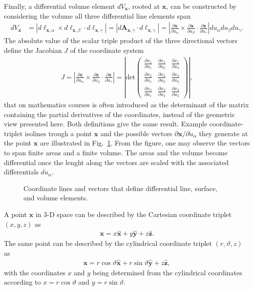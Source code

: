 Finally, a differential volume element $dV_{\bm{x}}$, rooted at $\bm{x}$, can be constructed by considering the volume all three differential line elements span
\begin{align}
    dV_{\bm{x}}&=\left|d\bm{\ell}_{\bm{x},\alpha}\times d\bm{\ell}_{\bm{x},\beta}\cdot d\bm{\ell}_{\bm{x},\gamma}\right|=|d\bm{A}_{\bm{x},\gamma}\cdot d\bm{\ell}_{\bm{x},\gamma}|=\left|\frac{\partial \bm{x}}{\partial u_\alpha}\times\frac{\partial \bm{x}}{\partial u_\beta}\cdot\frac{\partial \bm{x}}{\partial u_\gamma}\right|du_\alpha du_\beta du_\gamma.
\end{align}
The absolute value of the scalar triple product of the three directional vectors define the Jacobian $J$ of the coordinate system
\begin{align}
    J=\left|\frac{\partial \bm{x}}{\partial u_\alpha}\times\frac{\partial \bm{x}}{\partial u_\beta}\cdot\frac{\partial \bm{x}}{\partial u_\gamma}\right|=\left|\text{det}\begin{pmatrix}
        \frac{\partial x_1}{\partial u_1} & \frac{\partial x_1}{\partial u_2} & \frac{\partial x_1}{\partial u_3} \\
        \frac{\partial x_2}{\partial u_1} & \frac{\partial x_2}{\partial u_2} & \frac{\partial x_2}{\partial u_3} \\
        \frac{\partial x_3}{\partial u_1} & \frac{\partial x_3}{\partial u_2} & \frac{\partial x_3}{\partial u_3}
    \end{pmatrix}\right|,
\end{align}
that on mathematics courses is often introduced as the determinant of the matrix containing the partial derivatives of the coordinates, instead of the geometric view presented here. Both definitions give the same result.
Example coordinate-triplet isolines trough a point $\bm{x}$ and the possible vectors $\partial\bm{x}/\partial u_\alpha$ they generate at the point $\bm{x}$ are illustrated in Fig.~\ref{fig:differential-elements}. From the figure, one may observe the vectors to span finite areas and a finite volume. The areas and the volume become differential once the lenght along the vectors are scaled with the associated differentials $du_\alpha$.
\begin{figure}[!htb]
    \centering
    
    \caption{Coordinate lines and vectors that define differential line, surface, and volume elements.}
    \label{fig:differential-elements}
\end{figure}
\begin{example}
    A point $\bm{x}$ in 3-D space can be described by the Cartesian coordinate triplet $(x,y,z)$ as
    \begin{align*}
        \bm{x}=x\bm{\hat{x}}+y\bm{\hat{y}}+z\bm{\hat{z}}.
    \end{align*}
    The same point can be described by the cylindrical coordinate triplet $(r,\vartheta,z)$ as 
    \begin{align*}
        \bm{x}=r\cos\vartheta\bm{\hat{x}}+r\sin\vartheta\bm{\hat{y}}+z\bm{\hat{z}},
    \end{align*}
    with the coordinates $x$ and $y$ being determined from the cylindrical coordinates according to $x=r\cos\vartheta$ and $y=r\sin\vartheta$.
\end{example}
